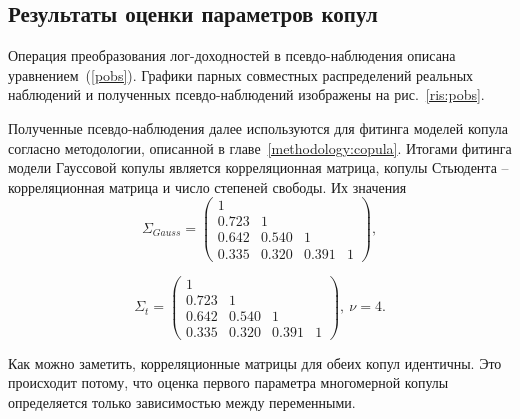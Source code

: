 
\subsection{Результаты оценки параметров копул}


Операция преобразования лог-доходностей в псевдо-наблюдения описана уравнением~(\ref{pobs}).
Графики парных совместных распределений реальных наблюдений и полученных псевдо-наблюдений изображены на рис.~\ref{ris:pobs}.

Полученные псевдо-наблюдения далее используются для фитинга моделей копула согласно методологии, описанной в главе~\ref{methodology:copula}.
Итогами фитинга модели Гауссовой копулы является корреляционная матрица, копулы Стьюдента -- корреляционная матрица и число степеней свободы. Их значения
%
\begin{equation} \label{gausscopfit}
    \Sigma_{Gauss} = \left(
    \begin{array}{cccc}
        1 & & & \\
        0.723 & 1 & & \\
        0.642 & 0.540 & 1 & \\
        0.335 & 0.320 & 0.391 & 1
    \end{array} \right),
\end{equation}

\begin{equation} \label{tcopfit}
    \Sigma_t = \left(
    \begin{array}{cccc}
        1 & & & \\
        0.723 & 1 & & \\
        0.642 & 0.540 & 1 & \\
        0.335 & 0.320 & 0.391 & 1
    \end{array} \right), \ \nu = 4.
\end{equation}

Как можно заметить, корреляционные матрицы для обеих копул идентичны. 
Это происходит потому, что оценка первого параметра многомерной копулы определяется только зависимостью между переменными.

